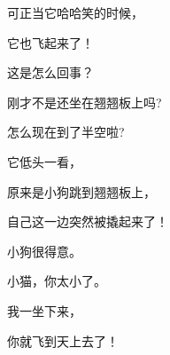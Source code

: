 \newpage
{} %
\vspace*{15pt}
{\linespread{1.5}\fontsize{18}{18}\selectfont
\par
可正当它哈哈笑的时候，\par
它也飞起来了！\par
这是怎么回事？\par
刚才不是还坐在翘翘板上吗?\par
怎么现在到了半空啦?\par
\par
\par}
\ClearShipoutPicture


\newpage
{} %
\vspace*{15pt}
{\linespread{1.5}\fontsize{18}{18}\selectfont
\par
它低头一看，\par
原来是小狗跳到翘翘板上，\par
自己这一边突然被撬起来了！\par
小狗很得意。\par
小猫，你太小了。\par
我一坐下来，\par
你就飞到天上去了！\par
\par
\par}
\ClearShipoutPicture



